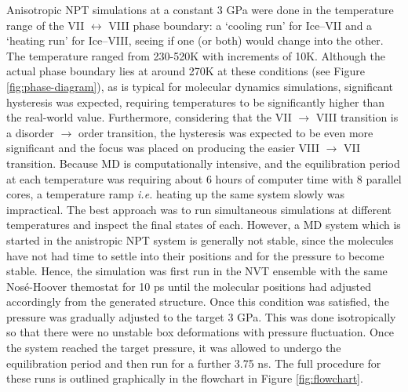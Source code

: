 \par
Anisotropic NPT simulations at a constant 3 GPa were done in the temperature range of the VII $\leftrightarrow$ VIII
phase boundary:
a `cooling run' for Ice--VII and a `heating run' for Ice--VIII, seeing if one (or both) would change
into the other.
The temperature ranged from 230-520K with increments of 10K. 
Although the actual phase boundary lies at around 270K at these conditions (see Figure \ref{fig:phase-diagram}),
as is typical for molecular dynamics simulations, significant hysteresis was expected, requiring temperatures 
to be significantly higher than the real-world value.
Furthermore, considering that the VII $\to$ VIII transition is a disorder $\to$ order transition, the
hysteresis was expected to be even more significant and the focus was placed on producing the easier VIII $\to$
VII transition.
Because MD is computationally intensive, and the equilibration period at each temperature was requiring
about 6 hours of computer time with 8 parallel cores, a temperature ramp \textit{i.e.} heating up the
same system slowly was impractical.
The best approach was to run simultaneous simulations at different temperatures and inspect the final
states of each.
However, a MD system which is started in the anistropic NPT system is generally not stable, since the molecules
have not had time to settle into their positions and for the pressure to become stable.
Hence, the simulation was first run in the NVT ensemble with the same Nosé-Hoover themostat for 10 ps until 
the molecular positions had adjusted accordingly from the generated structure.
Once this condition was satisfied, the pressure was gradually adjusted to the target 3 GPa.
This was done isotropically so that there were no unstable box deformations with pressure fluctuation.
Once the system reached the target pressure, it was allowed to undergo the equilibration period and
then run for a further 3.75 ns.
The full procedure for these runs is outlined graphically in the flowchart in Figure \ref{fig:flowchart}.
